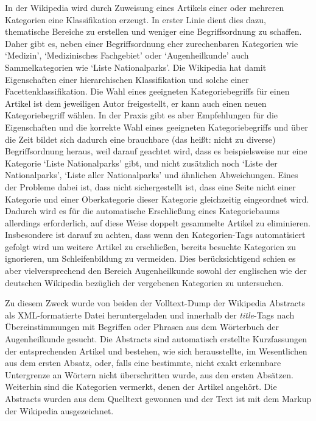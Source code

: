\documentclass[pagesize,DIV=calc,12pt,draft]{scrreprt}
\begin{document}
In der Wikipedia wird durch Zuweisung eines Artikels einer oder mehreren Kategorien eine Klassifikation erzeugt. 
In erster Linie dient dies dazu, thematische Bereiche zu erstellen und weniger eine Begriffsordnung zu schaffen. 
Daher gibt es, neben einer Begriffsordnung eher zurechenbaren Kategorien wie `Medizin', `Medizinisches Fachgebiet' oder `Augenheilkunde' auch Sammelkategorien wie `Liste Nationalparks'. 
Die Wikipedia hat damit Eigenschaften einer hierarchischen Klassifikation und solche einer Facettenklassifikation. 
Die Wahl eines geeigneten Kategoriebegriffs für einen Artikel ist dem jeweiligen Autor freigestellt, er kann auch einen neuen Kategoriebegriff wählen. 
In der Praxis gibt es aber Empfehlungen für die Eigenschaften und die korrekte Wahl eines geeigneten Kategoriebegriffs und über die Zeit bildet sich dadurch eine brauchbare (das heißt: nicht zu diverse) Begriffsordnung heraus, weil darauf geachtet wird, dass es beispielsweise nur eine Kategorie `Liste Nationalparks' gibt, und nicht zusätzlich noch `Liste der Nationalparks', `Liste aller Nationalparks' und ähnlichen Abweichungen. 
Eines der Probleme dabei ist, dass nicht sichergestellt ist, dass eine Seite nicht einer Kategorie und einer Oberkategorie dieser Kategorie gleichzeitig eingeordnet wird. 
Dadurch wird es für die automatische Erschließung eines Kategoriebaums allerdings erforderlich, auf diese Weise doppelt gesammelte Artikel zu eliminieren. 
Insbesondere ist darauf zu achten, dass wenn den Kategorien-Tags automatisiert gefolgt wird um weitere Artikel zu erschließen, bereits besuchte Kategorien zu ignorieren, um Schleifenbildung zu vermeiden. 
Dies berücksichtigend schien es aber vielversprechend den Bereich Augenheilkunde sowohl der englischen wie der deutschen Wikipedia bezüglich der vergebenen Kategorien zu untersuchen. 

Zu diesem Zweck wurde von beiden der Volltext-Dump der Wikipedia Abstracts als XML-formatierte Datei heruntergeladen und innerhalb der \emph{title}-Tags nach Übereinstimmungen mit Begriffen oder Phrasen aus dem Wörterbuch der Augenheilkunde gesucht. 
Die Abstracts sind automatisch erstellte Kurzfassungen der entsprechenden Artikel und bestehen, wie sich herausstellte, im Wesentlichen aus dem ersten Absatz, oder, falls eine bestimmte, nicht exakt erkennbare Untergrenze an Wörtern nicht überschritten wurde, aus den ersten Absätzen. 
Weiterhin sind die Kategorien vermerkt, denen der Artikel angehört. 
Die Abstracts wurden aus dem Quelltext gewonnen und der Text ist mit dem Markup der Wikipedia ausgezeichnet. 
\end{document}
